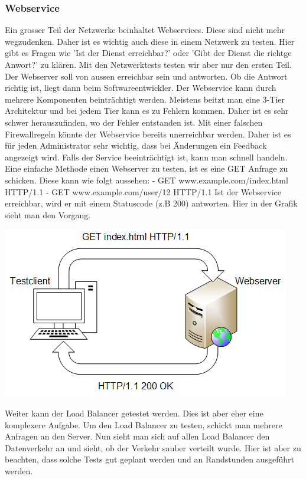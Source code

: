 \documentclass[a4,12pt]{scrartcl}
\begin{document}
\subsubsection{Webservice}
Ein grosser Teil der Netzwerke beinhaltet Webservices. Diese sind nicht mehr wegzudenken. Daher ist es wichtig auch diese in einem Netzwerk zu testen. Hier gibt es Fragen wie 'Ist der Dienst erreichbar?' oder 'Gibt der Dienst die richtge Anwort?' zu klären. Mit den Netzwerktests testen wir aber nur den ersten Teil. Der Webserver soll von aussen erreichbar sein und antworten. Ob die Antwort richtig ist, liegt dann beim Softwareentwickler.\newline\newline
Der Webservice kann durch mehrere Komponenten beinträchtigt werden. Meistens beitzt man eine 3-Tier Architektur und bei jedem Tier kann es zu Fehlern kommen. Daher ist es sehr schwer herauszufinden, wo der Fehler entstanden ist. Mit einer falschen Firewallregeln könnte der Webservice bereits unerreichbar werden. Daher ist es für jeden Administrator sehr wichtig, dass bei Änderungen ein Feedback angezeigt wird. Falls der Service beeinträchtigt ist, kann man schnell handeln.\newline\newline
Eine einfache Methode einen Webserver zu testen, ist es eine GET Anfrage zu schicken. Diese kann wie folgt aussehen:\newline
- GET www.example.com/index.html HTTP/1.1 \newline
- GET www.example.com/user/12 HTTP/1.1 \newline
Ist der Webservice erreichbar, wird er mit einem Statuscode (z.B 200) antworten. Hier in der Grafik sieht man den Vorgang.
\begin{center}
\includegraphics[scale=1]{figures/httpget.png}
\end{center}
Weiter kann der Load Balancer getestet werden. Dies ist aber eher eine komplexere Aufgabe. Um den Load Balancer zu testen, schickt man mehrere Anfragen an den Server. Nun sieht man sich auf allen Load Balancer den Datenverkehr an und sieht, ob der Verkehr sauber verteilt wurde. Hier ist aber zu beachten, dass solche Tests gut geplant werden und an Randstunden ausgeführt werden.
\end{document}
